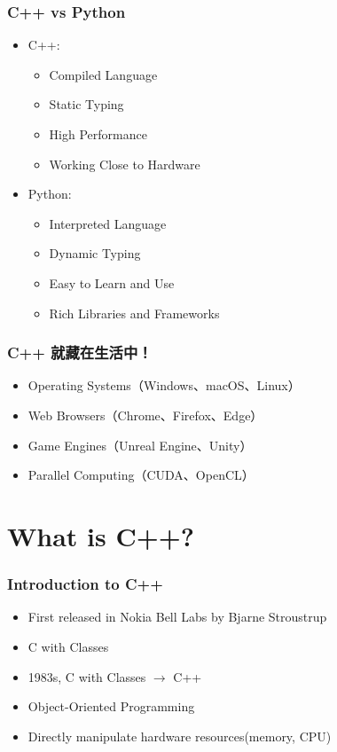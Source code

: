 \documentclass[xcolor=dvipsnames]{beamer}
\begin{document}
    \begin{frame}
        \frametitle{C++ vs Python}
        \begin{itemize}
            \item C++:
            \begin{itemize}
                \item Compiled Language
                \item Static Typing
                \item High Performance
                \item Working Close to Hardware
            \end{itemize}
            \item Python:
            \begin{itemize}
                \item Interpreted Language
                \item Dynamic Typing
                \item Easy to Learn and Use
                \item Rich Libraries and Frameworks
            \end{itemize}
        \end{itemize}
    \end{frame}

    \begin{frame}
        \frametitle{C++ 就藏在生活中！}
        \begin{itemize}
            \item Operating Systems（Windows、macOS、Linux）
            \item Web Browsers（Chrome、Firefox、Edge）
            \item Game Engines（Unreal Engine、Unity）
            \item Parallel Computing（CUDA、OpenCL）
        \end{itemize}
    \end{frame}

    \section{What is C++?}
    
    \begin{frame}
        \frametitle{Introduction to C++}
        \begin{itemize}
            \item First released in Nokia Bell Labs by Bjarne Stroustrup
            \item C with Classes
            \item 1983s, C with Classes $\rightarrow$ C++
            \item Object-Oriented Programming
            \item Directly manipulate hardware resources(memory, CPU)
        \end{itemize}
    \end{frame}
\end{document}
